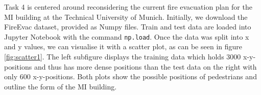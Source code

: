 

Task 4 is centered around reconsidering the current fire evacuation plan for the MI building at the Technical University of Munich. Initially, we download the FireEvac dataset, provided as Numpy \cite{harris2020array} files. Train and test data are loaded into Jupyter Notebook \cite{Kluyver2016jupyter} with the command \texttt{np.load}. Once the data was split into x and y values, we can visualise it with a scatter plot, as can be seen in figure \ref{fig:scatter1}. The left subfigure displays the training data which holds 3000 x-y-positions and thus has more dense positions than the test data on the right with only 600 x-y-positions. Both plots show the possible positions of pedestrians and outline the form of the MI building. 

